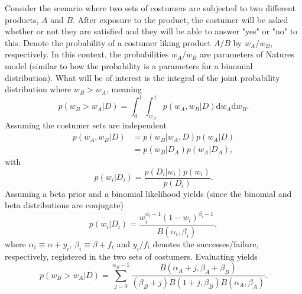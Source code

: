 \begin{example}
	Consider the scenario where two sets of costumers are subjected to two different products, $A$ and $B$. After exposure to the product, the costumer will be asked whether or not they are satisfied and they will be able to answer "yes" or "no" to this. Denote the probability of a costumer liking product $A/B$ by $w_A/w_B$, respectively. In this context, the probabilities $w_A/w_B$ are parameters of Natures model (similar to how the probability is a parameters for a binomial distribution). What will be of interest is the integral of the joint probability distribution where $w_B>w_A$, meaning
	\begin{equation}
		p(w_B > w_A|D)= \int_0^1\int_{w_A}^1p(w_A,w_B|D)\mathrm{d}w_A\mathrm{d}w_B.
		\label{e1}
	\end{equation}
	Assuming the costumer sets are independent
	\begin{equation}
		\begin{split}
			p(w_A,w_B|D) &= p(w_B|w_A,D)p(w_A|D)\\
			& = p(w_B|D_A)p(w_A|D_A),
		\end{split}
	\end{equation}
	with
	\begin{equation}
		p(w_i|D_i)=\frac{p(D_i|w_i)p(w_i)}{p(D_i)}.
	\end{equation}
	Assuming a beta prior and a binomial likelihood yields (since the binomial and beta distributions are conjugate)
	\begin{equation}
		p(w_i|D_i)=\frac{w_i^{\alpha_i-1}(1-w_i)^{\beta_i-1}}{B(\alpha_i,\beta_i)},
	\end{equation}
	where $\alpha_i\equiv \alpha+y_i$, $\beta_i\equiv \beta+f_i$ and $y_i/f_i$ denotes the successes/failure, respectively, registered in the two sets of costumers. Evaluating  yields
	\begin{equation}
		p(w_B > w_A|D)= \sum_{j=0}^{\alpha_B-1}\frac{B(\alpha_A+j,\beta_A+\beta_B)}{(\beta_B+j)B(1+j,\beta_B)B(\alpha_A,\beta_A)}.
	\end{equation}
	
\end{example}


